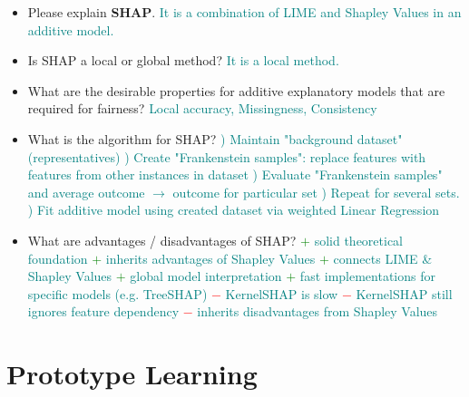 \documentclass{report}
\newcommand{\asw}[2][teal]{}
\renewcommand{\asw}[2][teal]{\textcolor{#1}{#2}}
\begin{document}
\begin{itemize}
	\item Please explain \textbf{SHAP}.
	\asw{\newline It is a combination of LIME and Shapley Values in an additive model.}
	\item Is SHAP a local or global method?
	\asw{\newline It is a local method.}
	\item What are the desirable properties for additive explanatory models that are required for fairness?
	\asw{\newline Local accuracy,
		\newline Missingness,
		\newline Consistency}
	\item What is the algorithm for SHAP?
	\asw{) Maintain "background dataset" (representatives)
		\newline 2) Create "Frankenstein samples": replace features with features from other instances in dataset
		\newline 3) Evaluate "Frankenstein samples" and average outcome $\rightarrow$ outcome for particular set
		\newline 4) Repeat for several sets.
		\newline 5) Fit additive model using created dataset via weighted Linear Regression}
	\item What are advantages / disadvantages of SHAP?
	\asw{\newline \textcolor{green}{$+$} solid theoretical foundation
		\newline \textcolor{green}{$+$} inherits advantages of Shapley Values
		\newline \textcolor{green}{$+$} connects LIME \& Shapley Values
		\newline \textcolor{green}{$+$} global model interpretation
		\newline \textcolor{green}{$+$} fast implementations for specific models (e.g. TreeSHAP)
		\newline \textcolor{red}{$-$} KernelSHAP is slow
		\newline \textcolor{red}{$-$} KernelSHAP still ignores feature dependency
		\newline \textcolor{red}{$-$} inherits disadvantages from Shapley Values}
	
	\end{itemize}
	\newpage
	
	\section{Prototype Learning}
	
\end{document}
